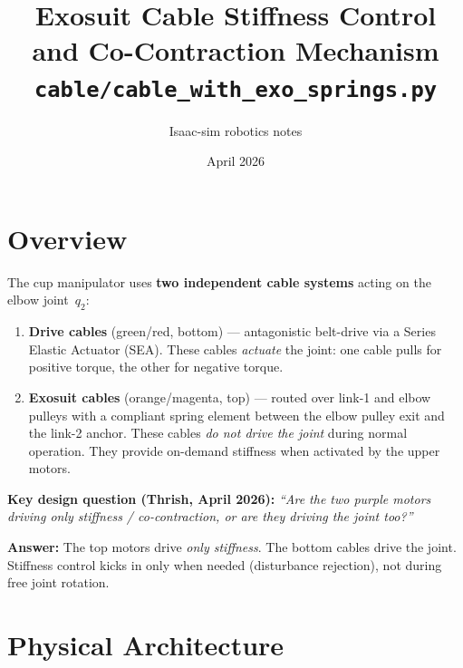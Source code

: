 \documentclass[11pt, a4paper]{article}
\title{\textbf{Exosuit Cable Stiffness Control \\and Co-Contraction Mechanism}\\
       \large \texttt{cable/cable\_with\_exo\_springs.py}}
\date{April 2026}
\author{Isaac-sim robotics notes}
\begin{document}
\maketitle

\section{Overview}

The cup manipulator uses \textbf{two independent cable systems} acting on the
elbow joint~$q_2$:

\begin{enumerate}
    \item \textbf{Drive cables} (green/red, bottom) --- antagonistic belt-drive
          via a Series Elastic Actuator (SEA).  These cables \emph{actuate}
          the joint: one cable pulls for positive torque, the other for
          negative torque.
    \item \textbf{Exosuit cables} (orange/magenta, top) --- routed over
          link-1 and elbow pulleys with a compliant spring element between
          the elbow pulley exit and the link-2 anchor.  These cables
          \emph{do not drive the joint} during normal operation.  They
          provide on-demand stiffness when activated by the upper motors.
\end{enumerate}

\begin{mdframed}
\textbf{Key design question (Thrish, April 2026):}
\emph{``Are the two purple motors driving only stiffness / co-contraction,
or are they driving the joint too?''}

\medskip\noindent
\textbf{Answer:} The top motors drive \emph{only stiffness}.  The bottom
cables drive the joint.  Stiffness control kicks in only when needed
(disturbance rejection), not during free joint rotation.
\end{mdframed}

\section{Physical Architecture}
\end{document}
